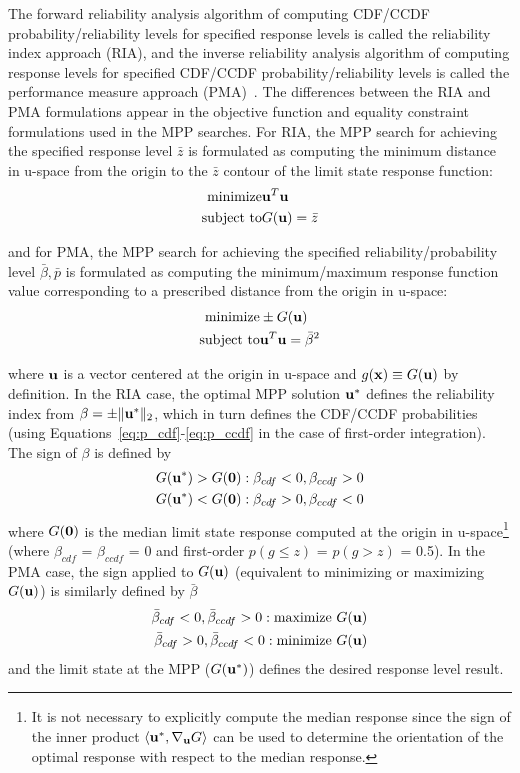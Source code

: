 The forward reliability analysis algorithm of computing CDF/CCDF
probability/reliability levels for specified response levels is called
the reliability index approach (RIA), and the inverse reliability
analysis algorithm of computing response levels for specified CDF/CCDF
probability/reliability levels is called the performance measure
approach (PMA)~\cite{Tu99}.  The differences between the RIA and PMA
formulations appear in the objective function and equality constraint
formulations used in the MPP searches.  For RIA, the MPP search for
achieving the specified response level $\bar{z}$ is formulated as
computing the minimum distance in u-space from the origin to the
$\bar{z}$ contour of the limit state response function:
\begin{eqnarray}
{\rm minimize}     & {\bf u}^T {\bf u} \nonumber \\
{\rm subject \ to} & G({\bf u}) = \bar{z} \label{eq:ria_opt}
\end{eqnarray}

and for PMA, the MPP search for achieving the specified
reliability/probability level $\bar{\beta},\bar{p}$ is formulated as
computing the minimum/maximum response function value corresponding
to a prescribed distance from the origin in u-space:
\begin{eqnarray}
{\rm minimize}     & \pm G({\bf u}) \nonumber \\
{\rm subject \ to} & {\bf u}^T {\bf u} = \bar{\beta}^2 \label{eq:pma_opt}
\end{eqnarray}

where ${\bf u}$ is a vector centered at the origin in 
u-space and $g({\bf x}) \equiv G({\bf u})$ by definition.  In the RIA
case, the optimal MPP solution ${\bf u}^*$ defines the reliability 
index from $\beta = \pm \|{\bf u}^*\|_2$, which in turn defines the 
CDF/CCDF probabilities (using Equations~\ref{eq:p_cdf}-\ref{eq:p_ccdf} in 
the case of first-order integration).  The sign of $\beta$ is defined by
\begin{eqnarray}
G({\bf u}^*) > G({\bf 0}): \beta_{cdf} < 0, \beta_{ccdf} > 0 \\
G({\bf u}^*) < G({\bf 0}): \beta_{cdf} > 0, \beta_{ccdf} < 0
\end{eqnarray}
\noindent where $G({\bf 0})$ is the median limit state response computed 
at the origin in u-space\footnote{It is not necessary to explicitly compute
the median response since the sign of the inner product 
$\langle {\bf u}^*, \nabla_{\bf u} G \rangle$
can be used to determine the orientation of the optimal response with 
respect to the median response.} (where $\beta_{cdf}$ = $\beta_{ccdf}$ = 0 
and first-order $p(g \le z)$ = $p(g > z)$ = 0.5).  In the PMA case, the 
sign applied to $G({\bf u})$ (equivalent to minimizing or maximizing 
$G({\bf u})$) is similarly defined by $\bar{\beta}$
\begin{eqnarray}
\bar{\beta}_{cdf} < 0, \bar{\beta}_{ccdf} > 0: {\rm maximize \ } G({\bf u}) \\
\bar{\beta}_{cdf} > 0, \bar{\beta}_{ccdf} < 0: {\rm minimize \ } G({\bf u})
\end{eqnarray}
and the limit state at the MPP ($G({\bf u}^*)$) defines the desired
response level result.

